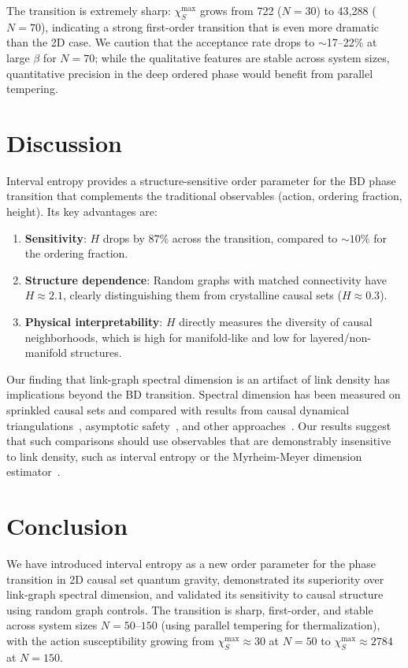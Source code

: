 \documentclass[aps,prd,twocolumn,superscriptaddress,nofootinbib]{revtex4-2}
\begin{document}
The transition is extremely sharp: $\chi_S^{\max}$ grows from 722 ($N = 30$) to 43{,}288 ($N = 70$), indicating a strong first-order transition that is even more dramatic than the 2D case. We caution that the acceptance rate drops to $\sim$17--22\% at large $\beta$ for $N = 70$; while the qualitative features are stable across system sizes, quantitative precision in the deep ordered phase would benefit from parallel tempering.

\section{Discussion}

Interval entropy provides a structure-sensitive order parameter for the BD phase transition that complements the traditional observables (action, ordering fraction, height). Its key advantages are:

\begin{enumerate}
\item \textbf{Sensitivity}: $H$ drops by $87\%$ across the transition, compared to $\sim$$10\%$ for the ordering fraction.
\item \textbf{Structure dependence}: Random graphs with matched connectivity have $H \approx 2.1$, clearly distinguishing them from crystalline causal sets ($H \approx 0.3$).
\item \textbf{Physical interpretability}: $H$ directly measures the diversity of causal neighborhoods, which is high for manifold-like and low for layered/non-manifold structures.
\end{enumerate}

Our finding that link-graph spectral dimension is an artifact of link density has implications beyond the BD transition. Spectral dimension has been measured on sprinkled causal sets and compared with results from causal dynamical triangulations~\cite{ambjorn2005}, asymptotic safety~\cite{lauscher2005}, and other approaches~\cite{carlip2017}. Our results suggest that such comparisons should use observables that are demonstrably insensitive to link density, such as interval entropy or the Myrheim-Meyer dimension estimator~\cite{myrheim1978,meyer1988}.

\section{Conclusion}

We have introduced interval entropy as a new order parameter for the phase transition in 2D causal set quantum gravity, demonstrated its superiority over link-graph spectral dimension, and validated its sensitivity to causal structure using random graph controls. The transition is sharp, first-order, and stable across system sizes $N = 50$--$150$ (using parallel tempering for thermalization), with the action susceptibility growing from $\chi_S^{\max} \approx 30$ at $N = 50$ to $\chi_S^{\max} \approx 2784$ at $N = 150$.
\end{document}
